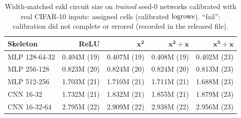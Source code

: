 \begin{table}[h]
\centering
\caption{Width-matched ezkl circuit size on \emph{trained} seed-0 networks calibrated with real CIFAR-10 inputs: assigned cells (calibrated $\mathrm{logrows}$).
  ``fail'': calibration did not complete or errored (recorded in the released file).}
\label{tab:matchedtrained}
\small
\begin{tabular}{lrrrr}
\toprule
\textbf{Skeleton} & \textbf{ReLU} & $\mathbf{x^2}$ & $\mathbf{x^2{+}x}$ & $\mathbf{x^3{+}x}$ \\
\midrule
MLP 128-64-32 & 0.404M (19) & 0.407M (19) & 0.408M (19) & 0.402M (23) \\
MLP 256-128 & 0.823M (20) & 0.824M (20) & 0.824M (20) & 0.813M (23) \\
MLP 512-256 & 1.703M (21) & 1.710M (21) & 1.711M (21) & 1.688M (23) \\
CNN 16-32 & 1.732M (21) & 1.832M (21) & 1.855M (21) & 1.879M (23) \\
CNN 16-32-64 & 2.795M (22) & 2.909M (22) & 2.938M (22) & 2.956M (23) \\
\bottomrule
\end{tabular}
\end{table}
